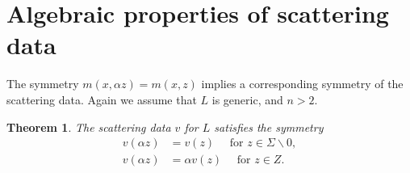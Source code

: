 \documentclass{surv-l}
\theoremstyle{plain}
\newtheorem{theorem}{Theorem}[section]
\theoremstyle{definition}
\numberwithin{equation}{chapter}
\begin{document}
\section{Algebraic properties of scattering data}\label{sec12}
The symmetry $m(x, \alpha z)= m(x, z)$ implies a corresponding symmetry of the scattering data. Again we assume that $L$ is generic, and $n>2$.
\setcounter{theorem}{0}
\begin{theorem}\label{thm12.1}
The scattering data $v$ for $L$ satisfies the symmetry
\setcounter{equation}{1}
\begin{align}\label{eq12.2}
v(\alpha z)&=v(z)\quad \text{ for } z\in\Sigma\backslash 0,\\\label{eq12.3}
v(\alpha z)&=\alpha v(z)\quad \text{ for } z\in Z.
\end{align}
\end{theorem}
\end{document}
